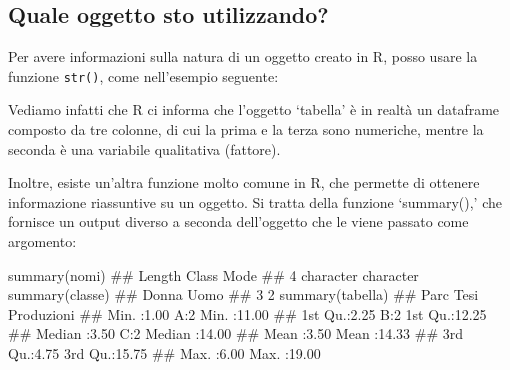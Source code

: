 \documentclass[a4paper,12pt,oneside]{book}
\newenvironment{Shaded}{\begin{snugshade}}{\end{snugshade}}
\newcommand{\DocumentationTok}[1]{#1}
\newcommand{\FunctionTok}[1]{#1}
\newcommand{\NormalTok}[1]{#1}
\begin{document}
\hypertarget{quale-oggetto-sto-utilizzando}{%
\subsection*{Quale oggetto sto utilizzando?}\label{quale-oggetto-sto-utilizzando}}

Per avere informazioni sulla natura di un oggetto creato in R, posso usare la funzione \texttt{str()}, come nell'esempio seguente:

\begin{Shaded}
\end{Shaded}

Vediamo infatti che R ci informa che l'oggetto `tabella' è in realtà un dataframe composto da tre colonne, di cui la prima e la terza sono numeriche, mentre la seconda è una variabile qualitativa (fattore).

Inoltre, esiste un'altra funzione molto comune in R, che permette di ottenere informazione riassuntive su un oggetto. Si tratta della funzione `summary(),' che fornisce un output diverso a seconda dell'oggetto che le viene passato come argomento:

\begin{Shaded}
\begin{Highlighting}[]
\FunctionTok{summary}\NormalTok{(nomi)}
\DocumentationTok{\#\#    Length     Class      Mode }
\DocumentationTok{\#\#         4 character character}
\FunctionTok{summary}\NormalTok{(classe)}
\DocumentationTok{\#\# Donna  Uomo }
\DocumentationTok{\#\#     3     2}
\FunctionTok{summary}\NormalTok{(tabella)}
\DocumentationTok{\#\#       Parc      Tesi    Produzioni   }
\DocumentationTok{\#\#  Min.   :1.00   A:2   Min.   :11.00  }
\DocumentationTok{\#\#  1st Qu.:2.25   B:2   1st Qu.:12.25  }
\DocumentationTok{\#\#  Median :3.50   C:2   Median :14.00  }
\DocumentationTok{\#\#  Mean   :3.50         Mean   :14.33  }
\DocumentationTok{\#\#  3rd Qu.:4.75         3rd Qu.:15.75  }
\DocumentationTok{\#\#  Max.   :6.00         Max.   :19.00}
\end{Highlighting}
\end{Shaded}
\end{document}
